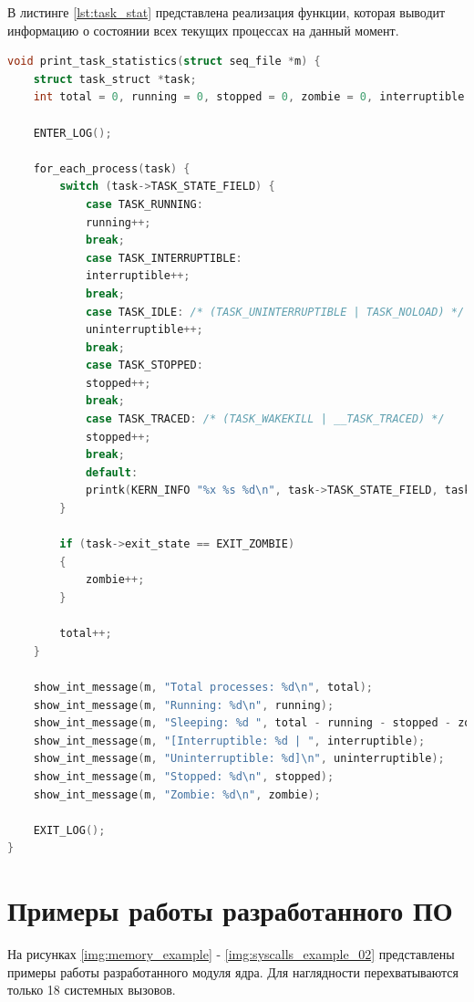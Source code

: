 В листинге \ref{lst:task_stat} представлена реализация функции, которая выводит информацию о состоянии всех текущих процессах на данный момент.\\

\begin{lstlisting}[label=lst:task_stat, caption=Реализация функции получения состояний всех процессов в системе, language=c]
void print_task_statistics(struct seq_file *m) {
	struct task_struct *task;
	int total = 0, running = 0, stopped = 0, zombie = 0, interruptible = 0, uninterruptible;
	
	ENTER_LOG();
	
	for_each_process(task) {
		switch (task->TASK_STATE_FIELD) {
			case TASK_RUNNING:
			running++;
			break;
			case TASK_INTERRUPTIBLE:
			interruptible++;
			break;
			case TASK_IDLE: /* (TASK_UNINTERRUPTIBLE | TASK_NOLOAD) */
			uninterruptible++;
			break;
			case TASK_STOPPED:
			stopped++;
			break;
			case TASK_TRACED: /* (TASK_WAKEKILL | __TASK_TRACED) */
			stopped++;
			break;
			default:
			printk(KERN_INFO "%x %s %d\n", task->TASK_STATE_FIELD, task->comm, task->pid);
		}
		
		if (task->exit_state == EXIT_ZOMBIE)
		{
			zombie++;
		}
		
		total++;
	}
	
	show_int_message(m, "Total processes: %d\n", total);
	show_int_message(m, "Running: %d\n", running);
	show_int_message(m, "Sleeping: %d ", total - running - stopped - zombie);
	show_int_message(m, "[Interruptible: %d | ", interruptible);
	show_int_message(m, "Uninterruptible: %d]\n", uninterruptible);
	show_int_message(m, "Stopped: %d\n", stopped);
	show_int_message(m, "Zombie: %d\n", zombie);
	
	EXIT_LOG();
}
\end{lstlisting}

\section{Примеры работы разработанного ПО}

На рисунках \ref{img:memory_example} - \ref{img:syscalls_example_02} представлены примеры работы разработанного модуля ядра. Для наглядности перехватываются только 18 системных вызовов.

